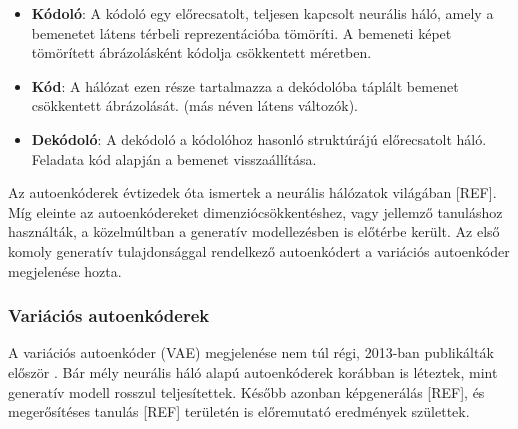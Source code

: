 \begin{itemize}
	\item \textbf{Kódoló}: A kódoló egy előrecsatolt, teljesen kapcsolt neurális háló, amely a bemenetet látens térbeli reprezentációba tömöríti. A bemeneti képet tömörített ábrázolásként kódolja csökkentett méretben.
	\item \textbf{Kód}: A hálózat ezen része tartalmazza a dekódolóba táplált bemenet csökkentett ábrázolását. (más néven látens változók).
	\item \textbf{Dekódoló}: A dekódoló a kódolóhoz hasonló struktúrájú előrecsatolt háló. Feladata kód alapján a bemenet visszaállítása.
\end{itemize}

Az autoenkóderek évtizedek óta ismertek a neurális hálózatok világában [REF]. Míg eleinte az autoenkódereket dimenziócsökkentéshez, vagy jellemző tanuláshoz használták, a közelmúltban a generatív modellezésben is előtérbe került. Az első komoly generatív tulajdonsággal rendelkező autoenkódert a variációs autoenkóder megjelenése hozta.



\subsubsection{Variációs autoenkóderek}

A variációs autoenkóder (VAE) megjelenése nem túl régi, 2013-ban publikálták először \cite{kingma2013auto}. Bár mély neurális háló alapú autoenkóderek korábban is léteztek, mint generatív modell rosszul teljesítettek. Később azonban képgenerálás [REF], és megerősítéses tanulás [REF] területén is előremutató eredmények születtek.

